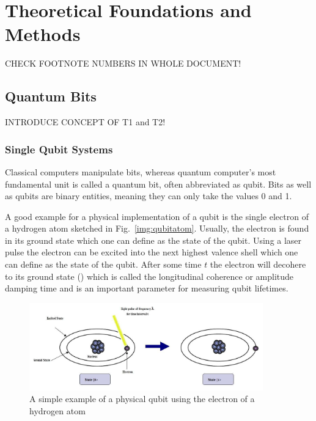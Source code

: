 \chapter{Theoretical Foundations and Methods}\label{sec:theoryandmethods}

CHECK FOOTNOTE NUMBERS IN WHOLE DOCUMENT!
\section{Quantum Bits}
\label{subsec:qubits}

INTRODUCE CONCEPT OF T1 and T2!

\subsection{Single Qubit Systems}
\label{subsubsec:qubits}
Classical computers manipulate bits, whereas quantum computer's most fundamental unit is called a quantum bit, often abbreviated as qubit. Bits as well as qubits are binary entities, meaning they can only take the values 0 and 1.

A good example for a physical implementation of a qubit is the single electron of a hydrogen atom sketched in Fig.~\ref{img:qubitatom}. Usually, the electron is found in its ground state which one can define as the \0 state of the qubit. Using a laser pulse the electron can be excited into the next highest valence shell which one can define as the \1 state of the qubit. After some time $t$ the electron will decohere to its ground state (\0) which is called the longitudinal coherence or amplitude damping time and is an important parameter for measuring qubit lifetimes.

\begin{figure}[!ht]
       \centering
       \includegraphics[width=0.9\textwidth]{img/qubitimplementation.jpeg}
       \caption{\label{fig:qubitatom} A simple example of a physical qubit using the electron of a hydrogen atom}
\end{figure}


